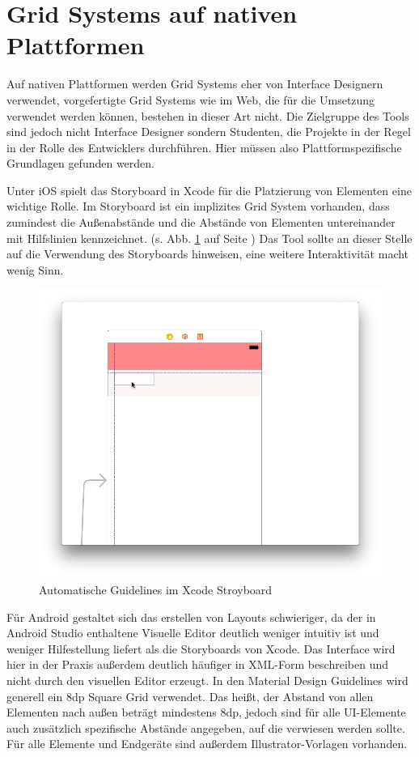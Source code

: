 \section{Grid Systems auf nativen Plattformen}
Auf nativen Plattformen werden Grid Systems eher von Interface Designern verwendet, vorgefertigte Grid Systems  wie im Web, die für die Umsetzung verwendet werden können, bestehen in dieser Art nicht. Die Zielgruppe des Tools sind jedoch nicht Interface Designer sondern Studenten, die Projekte in der Regel in der Rolle des Entwicklers durchführen. Hier müssen also Plattformspezifische Grundlagen gefunden werden.

Unter iOS spielt das Storyboard in Xcode für die Platzierung von Elementen eine wichtige Rolle. Im Storyboard ist ein implizites Grid System vorhanden, dass zumindest die Außenabstände und die Abstände von Elementen untereinander mit Hilfslinien kennzeichnet. (s. Abb. \ref{fig:xcode-guides} auf Seite \pageref{fig:xcode-guides})
Das Tool sollte an dieser Stelle auf die Verwendung des Storyboards hinweisen, eine weitere Interaktivität macht wenig Sinn.

\begin{figure}[h]
    \centering
    \includegraphics[width=1\textwidth]{images/xcode-guidelines.png}
    \caption{Automatische Guidelines im Xcode Stroyboard}
    \label{fig:xcode-guides}
\end{figure}

Für Android gestaltet sich das erstellen von Layouts schwieriger, da der in Android Studio enthaltene Visuelle Editor deutlich weniger intuitiv ist und weniger Hilfestellung liefert als die Storyboards von Xcode. Das Interface wird hier in der Praxis außerdem deutlich häufiger in XML-Form beschreiben und nicht durch den visuellen Editor erzeugt. In den Material Design Guidelines wird generell ein 8dp Square Grid verwendet. Das heißt, der Abstand von allen Elementen nach außen beträgt mindestens 8dp, jedoch sind für alle UI-Elemente auch zusätzlich spezifische Abstände angegeben, auf die verwiesen werden sollte. Für alle Elemente und Endgeräte sind außerdem Illustrator-Vorlagen vorhanden. 

